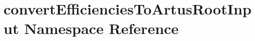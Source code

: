 \hypertarget{namespaceconvertEfficienciesToArtusRootInput}{
\section{convertEfficienciesToArtusRootInput Namespace Reference}
\label{namespaceconvertEfficienciesToArtusRootInput}
}
